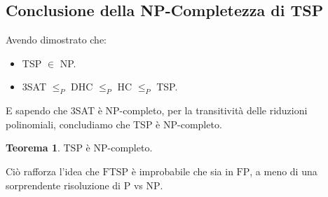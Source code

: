 \documentclass[a4paper]{article}
\theoremstyle{definition} %
\newtheorem{theorem}{Teorema}
\begin{document}
\subsection{Conclusione della NP-Completezza di TSP}

Avendo dimostrato che:
\begin{itemize}
    \item TSP $\in$ NP.
    \item 3SAT $\le_P$ DHC $\le_P$ HC $\le_P$ TSP.
\end{itemize}
E sapendo che 3SAT è NP-completo, per la transitività delle riduzioni polinomiali, concludiamo che TSP è NP-completo.

\begin{theorem}
$\text{TSP}$ è $\text{NP}$-completo.
\end{theorem}

Ciò rafforza l'idea che $\text{FTSP}$ è improbabile che sia in $\text{FP}$, a meno di una sorprendente risoluzione di $\text{P}$ vs $\text{NP}$.
\end{document}
